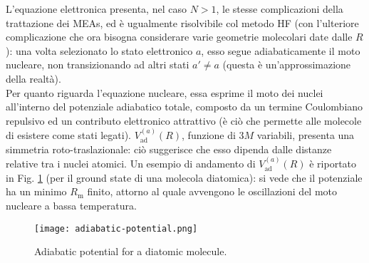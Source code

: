 L'equazione elettronica presenta, nel caso $ N > 1 $, le stesse complicazioni della trattazione dei MEAs, ed è ugualmente risolvibile col metodo HF (con l'ulteriore complicazione che ora bisogna considerare varie geometrie molecolari date dalle $ R $): una volta selezionato lo stato elettronico $ a $, esso segue adiabaticamente il moto nucleare, non transizionando ad altri stati $ a' \neq a $ (questa è un'approssimazione della realtà). \\
Per quanto riguarda l'equazione nucleare, essa esprime il moto dei nuclei all'interno del potenziale adiabatico totale, composto da un termine Coulombiano repulsivo ed un contributo elettronico attrattivo (è ciò che permette alle molecole di esistere come stati legati). $ V_\text{ad}^{(a)}(R) $, funzione di $ 3M $ variabili, presenta una simmetria roto-traslazionale: ciò suggerisce che esso dipenda dalle distanze relative tra i nuclei atomici. Un esempio di andamento di $ V_\text{ad}^{(a)}(R) $ è riportato in Fig. \ref{ad-pot} (per il ground state di una molecola diatomica): si vede che il potenziale ha un minimo $ R_\text{m} $ finito, attorno al quale avvengono le oscillazioni del moto nucleare a bassa temperatura.

\begin{figure}
	\centering
	\texttt{[image: adiabatic-potential.png]}
	\caption{Adiabatic potential for a diatomic molecule.}
	\label{ad-pot}
\end{figure}










